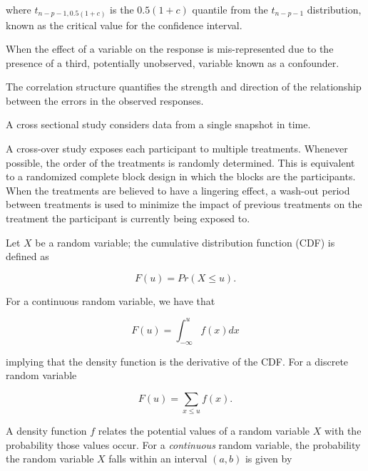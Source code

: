 \documentclass[
  letterpaper,
  DIV=11,
  numbers=noendperiod]{scrreprt}
\providecommand{\tightlist}{%
  \setlength{\itemsep}{0pt}\setlength{\parskip}{0pt}}\usepackage{longtable,booktabs,array}
\theoremstyle{definition}
\theoremstyle{definition}
\theoremstyle{remark}
\begin{document}
where \(t_{n-p-1, 0.5(1+c)}\) is the \(0.5(1+c)\) quantile from the
\(t_{n-p-1}\) distribution, known as the critical value for the
confidence interval.

\begin{description}
\tightlist
\item[Confounding (Definition~\ref{def-confounding})]
When the effect of a variable on the response is mis-represented due to
the presence of a third, potentially unobserved, variable known as a
confounder.
\item[Correlation Structure
(Definition~\ref{def-correlation-structure})]
The correlation structure quantifies the strength and direction of the
relationship between the errors in the observed responses.
\item[Cross Sectional Study
(Definition~\ref{def-cross-sectional-study})]
A cross sectional study considers data from a single snapshot in time.
\item[Cross-Over Study (Definition~\ref{def-cross-over-study})]
A cross-over study exposes each participant to multiple treatments.
Whenever possible, the order of the treatments is randomly determined.
This is equivalent to a randomized complete block design in which the
blocks are the participants. When the treatments are believed to have a
lingering effect, a wash-out period between treatments is used to
minimize the impact of previous treatments on the treatment the
participant is currently being exposed to.
\item[Cumulative Distribution Function (CDF) (Definition~\ref{def-cdf})]
Let \(X\) be a random variable; the cumulative distribution function
(CDF) is defined as
\end{description}

\[F(u) = Pr(X \leq u).\]

For a continuous random variable, we have that

\[F(u) = \int_{-\infty}^{u} f(x) dx\]

implying that the density function is the derivative of the CDF. For a
discrete random variable

\[F(u) = \sum_{x \leq u} f(x).\]

\begin{description}
\tightlist
\item[Density Function (Definition~\ref{def-density-function})]
A density function \(f\) relates the potential values of a random
variable \(X\) with the probability those values occur. For a
\emph{continuous} random variable, the probability the random variable
\(X\) falls within an interval \((a, b)\) is given by
\end{description}
\end{document}
